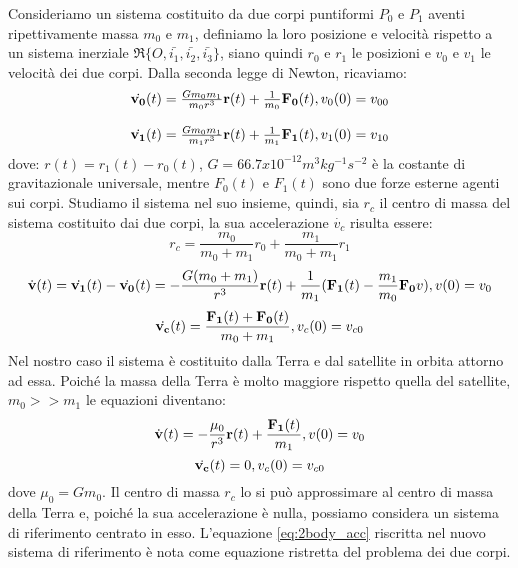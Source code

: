 Consideriamo un sistema costituito da due corpi puntiformi $P_0$ e
$P_1$ aventi ripettivamente massa $m_0$ e $m_1$, definiamo la loro posizione e
velocità rispetto a un sistema inerziale $\mathfrak{R} \{
O,\bar{i_1},\bar{i_2},\bar{i_3}\}$, siano quindi $r_0$ e $r_1$ le posizioni e
$v_0$ e $v_1$ le velocità dei due corpi. Dalla seconda legge di Newton,
ricaviamo:
\begin{equation}
\begin{array}{l}
\dot{\bf v_0}(t)=\frac{Gm_0m_1}{m_0r^3}{\bf r}(t) +
\frac{1}{m_0}{\bf F_0}(t),v_0(0)=v_{00}\\\\
\dot{\bf v_1}(t)=\frac{Gm_0m_1}{m_1r^3}{\bf r}(t) +
\frac{1}{m_1}{\bf F_1}(t),v_1(0)=v_{10}
\end{array}
\end{equation}
dove: $r(t)=r_1(t)-r_0(t)$, $G=66.7x10^{-12} m^3kg^{-1}s^{-2}$ è la costante di
gravitazionale universale, mentre $F_0(t)$ e $F_1(t)$ sono due forze esterne
agenti sui corpi.
Studiamo il sistema nel suo insieme, quindi, sia $r_c$ il centro di massa del
sistema costituito dai due corpi, la sua accelerazione $\dot{v_c}$ risulta essere:
\[r_c=\frac{m_0}{m_0+m_1}r_0+\frac{m_1}{m_0+m_1}r_1\]
\begin{equation}
\dot{\bf v}(t)=\dot{\bf v_1}(t)-\dot{\bf v_0}(t)=-\frac{G(m_0+m_1)}{r^3}{\bf
r}(t)+\frac{1}{m_1}({\bf F_1}(t)-\frac{m_1}{m_0}{\bf F_0}v), v(0)=v_0
\end{equation}
\begin{equation}
\dot{\bf v_c}(t)=\frac{{\bf F_1}(t)+{\bf F_0}(t)}{m_0+m_1},v_c(0)=v_{c0}
\end{equation}
Nel nostro caso il sistema è costituito dalla Terra e dal satellite in orbita
attorno ad essa. Poiché la massa della Terra è molto maggiore rispetto quella
del satellite, $m_0>>m_1$ le equazioni diventano:
\begin{equation}
\dot{\bf v}(t)=-\frac{\mu_0}{r^3}{\bf r}(t)+\frac{{\bf F_1}(t)}{m_1}, v(0)=v_0
\label{eq:2body_acc}
\end{equation}
\begin{equation}
\dot{\bf v_c}(t)=0, v_c(0)=v_{c0}
\end{equation}
dove $\mu_0=Gm_0$.
Il centro di massa $r_c$ lo si può approssimare al centro di massa della Terra
e, poiché la sua accelerazione è nulla, possiamo considera un sistema di
riferimento centrato in esso. L'equazione \ref{eq:2body_acc} riscritta
nel nuovo sistema di riferimento è nota come equazione ristretta del problema
dei due corpi.

